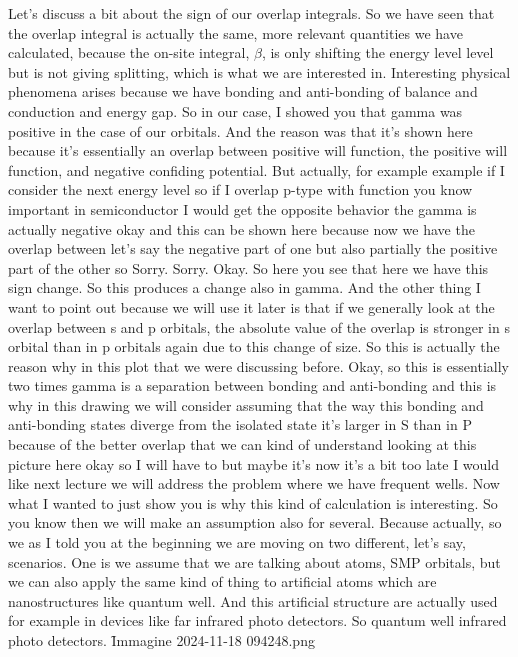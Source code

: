 Let's discuss a bit about the sign of our overlap integrals. So we have seen that the overlap integral is actually the same, more relevant quantities we have calculated, because the on-site integral, $\beta$, is only shifting the energy level level but is not giving splitting, which is what we are interested in. Interesting physical phenomena arises because we have bonding and anti-bonding of balance and conduction and energy gap. So in our case, I showed you that gamma was positive in the case of our orbitals. And the reason was that it's shown here because it's essentially an overlap between positive will function, the positive will function, and negative confiding potential. But actually, for example example if I consider the next energy level so if I overlap p-type with function you know important in semiconductor I would get the opposite behavior the gamma is actually negative okay and this can be shown here because now we have the overlap between let's say the negative part of one but also partially the positive part of the other so Sorry. Sorry. Okay. So here you see that here we have this sign change. So this produces a change also in gamma. And the other thing I want to point out because we will use it later is that if we generally look at the overlap between s and p orbitals, the absolute value of the overlap is stronger in s orbital than in p orbitals again due to this change of size. So this is actually the reason why in this plot that we were discussing before. Okay, so this is essentially two times gamma is a separation between bonding and anti-bonding and this is why in this drawing we will consider assuming that the way this bonding and anti-bonding states diverge from the isolated state it's larger in S than in P because of the better overlap that we can kind of understand looking at this picture here okay so I will have to but maybe it's now it's a bit too late I would like next lecture we will address the problem where we have frequent wells. Now what I wanted to just show you is why this kind of calculation is interesting. So you know then we will make an assumption also for several. Because actually, so we as I told you at the beginning we are moving on two different, let's say, scenarios. One is we assume that we are talking about atoms, SMP orbitals, but we can also apply the same kind of thing to artificial atoms which are nanostructures like quantum well. And this artificial structure are actually used for example in devices like far infrared photo detectors. So quantum well infrared photo detectors.
\f{Immagine 2024-11-18 094248.png}
